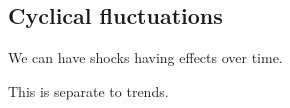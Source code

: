 
\subsection{Cyclical fluctuations}

We can have shocks having effects over time.

This is separate to trends.

